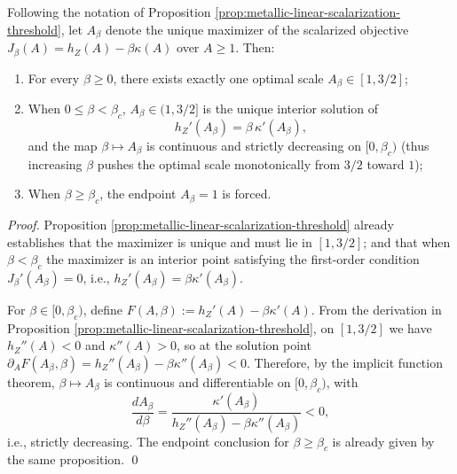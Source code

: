 \begin{corollary}\label{cor:metallic-pareto-scale-law}
Following the notation of Proposition \ref{prop:metallic-linear-scalarization-threshold}, let \(A_\beta\) denote the unique maximizer of the scalarized objective
\(
J_\beta(A)=h_Z(A)-\beta\kappa(A)
\)
over \(A\ge 1\).
Then:
\begin{enumerate}
  \item For every \(\beta\ge 0\), there exists exactly one optimal scale \(A_\beta\in[1,3/2]\);
  \item When \(0\le \beta<\beta_c\), \(A_\beta\in(1,3/2]\) is the unique interior solution of
  \[
  h_Z'(A_\beta)=\beta\,\kappa'(A_\beta),
  \]
  and the map \(\beta\mapsto A_\beta\) is continuous and strictly decreasing on \([0,\beta_c)\) (thus increasing \(\beta\) pushes the optimal scale monotonically from \(3/2\) toward \(1\));
  \item When \(\beta\ge \beta_c\), the endpoint \(A_\beta=1\) is forced.
\end{enumerate}
\end{corollary}
\begin{proof}
Proposition \ref{prop:metallic-linear-scalarization-threshold} already establishes that the maximizer is unique and must lie in \([1,3/2]\); and that when \(\beta<\beta_c\) the maximizer is an interior point satisfying the first-order condition \(J_\beta'(A_\beta)=0\), i.e., \(h_Z'(A_\beta)=\beta\kappa'(A_\beta)\).
\par
For \(\beta\in[0,\beta_c)\), define
\(
F(A,\beta):=h_Z'(A)-\beta\kappa'(A)
\).
From the derivation in Proposition \ref{prop:metallic-linear-scalarization-threshold}, on \([1,3/2]\) we have \(h_Z''(A)<0\) and \(\kappa''(A)>0\), so at the solution point
\(
\partial_A F(A_\beta,\beta)=h_Z''(A_\beta)-\beta\kappa''(A_\beta)<0
\).
Therefore, by the implicit function theorem, \(\beta\mapsto A_\beta\) is continuous and differentiable on \([0,\beta_c)\), with
\[
\frac{dA_\beta}{d\beta}
=\frac{\kappa'(A_\beta)}{h_Z''(A_\beta)-\beta\kappa''(A_\beta)}<0,
\]
i.e., strictly decreasing. The endpoint conclusion for \(\beta\ge\beta_c\) is already given by the same proposition. \qed
\end{proof}

